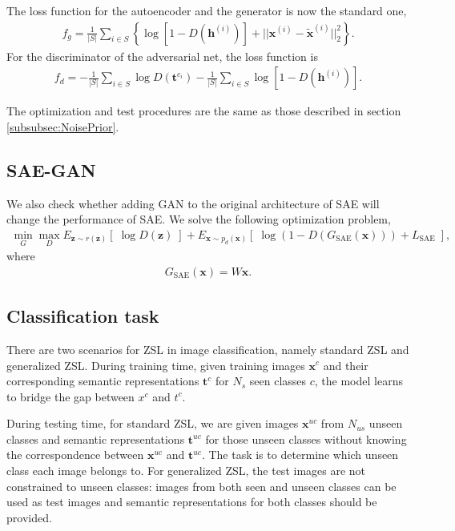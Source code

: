 \documentclass{article}
\newcommand{\bb}[1]{\boldsymbol{#1}}
\begin{document}
	The loss function for the autoencoder and the generator is now the standard one,
	\begin{align}
		f_g = \frac{1}{|S|} \sum_{i \in S} \left\{ \log\left[ 1 - D( \bb{h}^{(i)} ) \right] + || \bb{x}^{(i)} - \tilde{\bb{x}}^{(i)} ||_2^2 \right\}.
	\end{align}
	For the discriminator of the adversarial net, the loss function is
	\begin{align}
		f_d = -\frac{1}{|S|} \sum_{i \in S} \log D( \bb{t}^{c_i} ) - \frac{1}{|S|} \sum_{i \in S} \log\left[ 1 - D( \bb{h}^{(i)} ) \right].
	\end{align}
	
	The optimization and test procedures are the same as those described in section \ref{subsubsec:NoisePrior}.




\subsection{SAE-GAN}

	We also check whether adding GAN to the original architecture of SAE will change the performance of SAE. We solve the following optimization problem,
	\begin{align}
		\min_{G} \max_D E_{\bb{z} \sim r(\bb{z})}\left[\; \log D(\bb{z}) \;\right] + E_{\bb{x} \sim p_d(\bb{x})}\left[\; \log( 1 - D(G_{\textrm{SAE}}(\bb{x})) ) + L_{\textrm{SAE}} \;\right],
	\end{align}
	where
	\begin{align}
		G_{\textrm{SAE}}(\bb{x}) = W \bb{x}.
	\end{align}





\subsection{Classification task}

	There are two scenarios for ZSL in image classification, namely standard ZSL and generalized ZSL. During training time, given training images $\bb{x}^c$ and their corresponding semantic representations $\bb{t}^c$ for $N_s$ seen classes $c$, the model learns to bridge the gap between $x^c$ and $t^c$. 
    
	During testing time, for standard ZSL, we are given images $\bb{x}^{uc}$ from $N_{us}$ unseen classes and semantic representations $\bb{t}^{uc}$ for those unseen classes without knowing the correspondence between $\bb{x}^{uc}$ and $\bb{t}^{uc}$. The task is to determine which unseen class each image belongs to. For generalized ZSL, the test images are not constrained to unseen classes: images from both seen and unseen classes can be used as test images and semantic representations for both classes should be provided.
\end{document}

